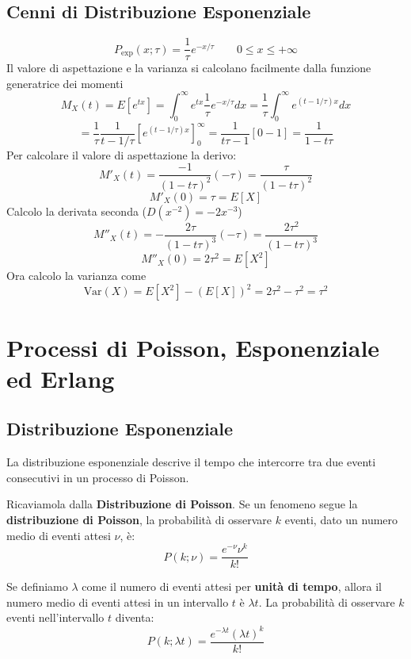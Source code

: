 \documentclass[openany,a4paper,12pt]{book}
\theoremstyle{remark}
\begin{document}
\subsection*{Cenni di Distribuzione Esponenziale}

\[
P_{\text{exp}}(x; \tau) = \frac{1}{\tau} e^{-x/\tau} \quad \quad 0 \le x \le +\infty
\]
Il valore di aspettazione e la varianza si calcolano facilmente dalla funzione generatrice dei momenti
\[
M_X(t) = E[e^{tx}] = \int_{0}^{\infty} e^{tx} \frac{1}{\tau} e^{-x/\tau} dx = \frac{1}{\tau} \int_{0}^{\infty} e^{(t - 1/\tau)x} dx
\]
\[
= \frac{1}{\tau} \frac{1}{t - 1/\tau} \left[ e^{(t - 1/\tau)x} \right]_0^\infty = \frac{1}{t\tau - 1} [0 - 1] = \frac{1}{1 - t\tau}
\]
Per calcolare il valore di aspettazione la derivo:
\[
M'_X(t) = \frac{-1}{(1 - t\tau)^2} (-\tau) = \frac{\tau}{(1 - t\tau)^2}
\]
\[
M'_X(0) = \tau = E[X]
\]
Calcolo la derivata seconda ($D(x^{-2}) = -2x^{-3}$)
\[
M''_X(t) = - \frac{2\tau}{(1 - t\tau)^3} (-\tau) = \frac{2\tau^2}{(1 - t\tau)^3}
\]
\[
M''_X(0) = 2\tau^2 = E[X^2]
\]
Ora calcolo la varianza come
\[
\text{Var}(X) = E[X^2] - (E[X])^2 = 2\tau^2 - \tau^2 = \tau^2
\]



\section{Processi di Poisson, Esponenziale ed Erlang}
\subsection{Distribuzione Esponenziale}
La distribuzione esponenziale descrive il tempo che intercorre tra due eventi consecutivi in un processo di Poisson.

Ricaviamola dalla \textbf{Distribuzione di Poisson}.
Se un fenomeno segue la \textbf{distribuzione di Poisson}, la probabilità di osservare $k$ eventi, dato un numero medio di eventi attesi $\nu$, è:
\begin{equation}
    P(k; \nu) = \frac{e^{-\nu} \nu^k}{k!}
\end{equation}

Se definiamo $\lambda$ come il numero di eventi attesi per \textbf{unità di tempo}, allora il numero medio di eventi attesi in un intervallo $t$ è $\lambda t$. La probabilità di osservare $k$ eventi nell'intervallo $t$ diventa:
\begin{equation}
    P(k; \lambda t) = \frac{e^{-\lambda t} (\lambda t)^k}{k!}
\end{equation}
\end{document}
